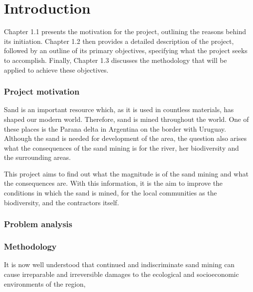 \chapter{Introduction}
\label{chapter:introduction}

Chapter 1.1 presents the motivation for the project, outlining the reasons behind its initiation. Chapter 1.2 then provides a detailed description of the project, followed by an outline of its primary objectives, specifying what the project seeks to accomplish. Finally, Chapter 1.3 discusses the methodology that will be applied to achieve these objectives.

\subsection{Project motivation}
Sand is an important resource which, as it is used in countless materials, has shaped our modern world. Therefore, sand is mined throughout the world. One of these places is the Parana delta in Argentina on the border with Uruguay. Although the sand is needed for development of the area, the question also arises what the consequences of the sand mining is for the river, her biodiversity and the surrounding areas. 

This project aims to find out what the magnitude is of the sand mining and what the consequences are. With this information, it is the aim to improve the conditions in which the sand is mined, for the local communities as the biodiversity, and the contractors itself.

\subsection{Problem analysis}




\subsection{Methodology}























It is now well understood that continued and indiscriminate sand mining can cause irreparable and irreversible damages to the ecological and socioeconomic environments of the region,

